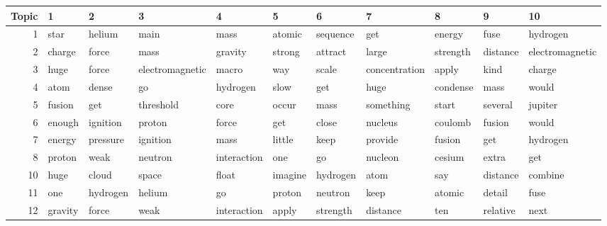\documentclass[10pt]{article}
\begin{document}
\begin{table}[tp]
    \centering
    \begin{tiny}
    \begin{tabular}{r|l|l|l|l|l|l|l|l|l|l}
    \textbf{Topic} & \textbf{1} & \textbf{2} &      \textbf{3} &  \textbf{4} & \textbf{5} & \textbf{6} &    \textbf{7} &  \textbf{8} & \textbf{9} &     \textbf{10} \\\hline
             1 &       star &     helium &            main &        mass &     atomic &   sequence &           get &      energy &       fuse &        hydrogen \\\hline
             2 &     charge &      force &            mass &     gravity &     strong &    attract &         large &    strength &   distance & electromagnetic \\\hline
             3 &       huge &      force & electromagnetic &       macro &        way &      scale & concentration &       apply &       kind &          charge \\\hline
             4 &       atom &      dense &              go &    hydrogen &       slow &        get &          huge &    condense &       mass &           would \\\hline
             5 &     fusion &        get &       threshold &        core &      occur &       mass &     something &       start &    several &         jupiter \\\hline
             6 &     enough &   ignition &          proton &       force &        get &      close &       nucleus &     coulomb &     fusion &           would \\\hline
             7 &     energy &   pressure &        ignition &        mass &     little &       keep &       provide &      fusion &        get &        hydrogen \\\hline
             8 &     proton &       weak &         neutron & interaction &        one &         go &       nucleon &      cesium &      extra &             get \\\hline
            10 &       huge &      cloud &           space &       float &    imagine &   hydrogen &          atom &         say &   distance &         combine \\\hline
            11 &        one &   hydrogen &          helium &          go &     proton &    neutron &          keep &      atomic &     detail &            fuse \\\hline
            12 &    gravity &      force &            weak & interaction &      apply &   strength &      distance &         ten &   relative &            next \\\hline

\end{tabular}
\end{tiny}
\end{table}
\end{document}

